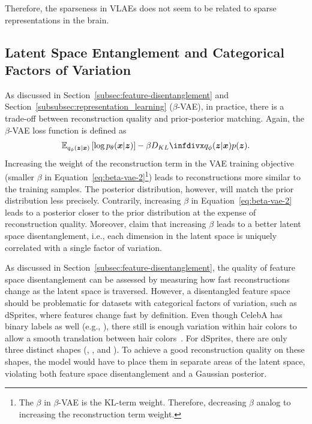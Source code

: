Therefore, the sparseness in \acp{VLAE} does not seem to be related to sparse representations in the brain.

\subsection{Latent Space Entanglement and Categorical Factors of Variation}\label{subsec:latent-space-entanglement-and-categorical-factors-of-variation}

As discussed in Section~\ref{subsec:feature-disentanglement} and Section~\ref{subsubsec:representation_learning} ($\beta$-\ac{VAE}), in practice, there is a trade-off between reconstruction quality and prior-posterior matching.
Again, the $\beta$-\ac{VAE} loss function is defined as
\begin{align}
    \mathbb{E}_{q_{\phi}(\bm{z} | \bm{x})}\left[\log p_{\theta}(\bm{x} | \bm{z})\right]-\beta \kldiv{q_{\phi}(\bm{z} | \bm{x})}{p(\bm{z})}. \label{eq:beta-vae-2}
\end{align}
Increasing the weight of the reconstruction term in the \ac{VAE} training objective (smaller $\beta$ in Equation~\ref{eq:beta-vae-2}\footnote{The $\beta$ in $\beta$-\ac{VAE} is the \ac{KL}-term weight. Therefore, decreasing $\beta$ analog to increasing the reconstruction term weight.}) leads to reconstructions more similar to the training samples.
The posterior distribution, however, will match the prior distribution less precisely.
Contrarily, increasing $\beta$ in Equation~\ref{eq:beta-vae-2} leads to a posterior closer to the prior distribution at the expense of reconstruction quality.
Moreover, \citet{higgins2017beta} claim that increasing $\beta$ leads to a better latent space disentanglement, i.e., each dimension in the latent space is uniquely correlated with a single factor of variation.

As discussed in Section~\ref{subsec:feature-disentanglement}, the quality of feature space disentanglement can be assessed by measuring how fast reconstructions change as the latent space is traversed.
However, a disentangled feature space should be problematic for datasets with categorical factors of variation, such as dSprites, where features change fast by definition.
Even though CelebA has binary labels as well (e.g., ), there still is enough variation within hair colors to allow a smooth translation between hair colors~\citep{higgins2017beta}.
For dSprites, there are only three distinct shapes (, , and ).
To achieve a good reconstruction quality on these shapes, the model would have to place them in separate areas of the latent space, violating both feature space disentanglement and a Gaussian posterior.


